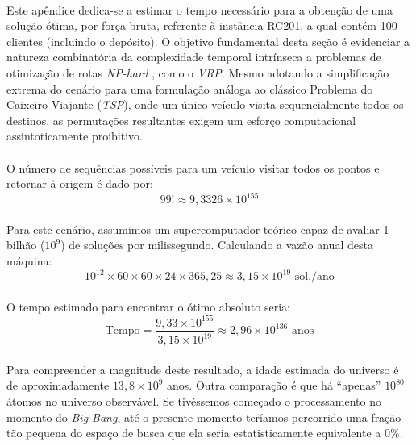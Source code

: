 \paragraph{} Este apêndice dedica-se a estimar o tempo necessário para a obtenção de uma solução ótima, por força bruta, referente à instância RC201, a qual contém 100 clientes (incluindo o depósito). O objetivo fundamental desta seção é evidenciar a natureza combinatória da complexidade temporal intrínseca a problemas de otimização de rotas \textit{NP-hard} \cite{Garey79}, como o \textit{VRP}. Mesmo adotando a simplificação extrema do cenário para uma formulação análoga ao clássico Problema do Caixeiro Viajante (\textit{TSP}), onde um único veículo visita sequencialmente todos os destinos, as permutações resultantes exigem um esforço computacional assintoticamente proibitivo.

\paragraph{} O número de sequências possíveis para um veículo visitar todos os pontos e retornar à origem é dado por:
\[
    99! \approx 9,3326 \times 10^{155}
\]

\paragraph{} Para este cenário, assumimos um supercomputador teórico capaz de avaliar 1 bilhão ($10^9$) de soluções por milissegundo. Calculando a vazão anual desta máquina:
\[
    10^{12} \times 60 \times 60 \times 24 \times 365,25 \approx 3,15 \times 10^{19} \text{ sol./ano}
\]

\paragraph{} O tempo estimado para encontrar o ótimo absoluto seria:
\[
    \text{Tempo} = \frac{9,33 \times 10^{155}}{3,15 \times 10^{19}} \approx 2,96 \times 10^{136} \text{ anos}
\]

\paragraph{} Para compreender a magnitude deste resultado, a idade estimada do universo é de aproximadamente $13,8 \times 10^9$ anos. Outra comparação é que há ``apenas'' $10^{80}$ átomos no universo observável. Se tivéssemos começado o processamento no momento do \textit{Big Bang}, até o presente momento teríamos percorrido uma fração tão pequena do espaço de busca que ela seria estatisticamente equivalente a $0\%$.
